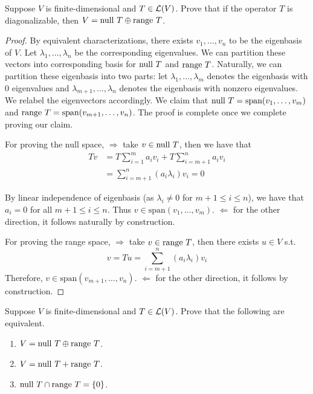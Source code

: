 \documentclass{extarticle}
\begin{document}
\begin{problem}{3}
    Suppose \(V\) is finite-dimensional and \(T \in \mathcal{L}(V)\). Prove that if the operator \(T\) is 
    diagonalizable, then \(V = \text{null } T \oplus \text{range } T\).
\end{problem}

\begin{proof}
By equivalent characterizations, there exists \(v_1, \ldots, v_n\) to be the eigenbasis of \(V\). Let 
\(\lambda_1, \ldots, \lambda_n\) be the corresponding eigenvalues. We can partition these vectors into corresponding 
basis for \(\text{null } T\) and \(\text{range } T\). Naturally, we can partition these eigenbasis into two parts: let 
\(\lambda_1, \ldots, \lambda_m\) denotes the eigenbasis with 0 eigenvalues and \(\lambda_{m+1}, \ldots, 
\lambda_n\) denotes the eigenbasis with nonzero eigenvalues. We relabel the eigenvectors accordingly. 
We claim that \(\text{null } T = \text{span}(v_1, 
\ldots, v_m)\) and \(\text{range } T = \text{span}(v_{m+1}, \ldots, v_n)\). The proof is complete once 
we complete proving our claim. 

For proving the null space, \(\Rightarrow\) take \(v \in \text{null } T\), then we have that 
\begin{align*}
    Tv 
    &= T \sum_{i=1}^{m}a_i v_i + T \sum_{i=m+1}^{n} a_i v_i \\ 
    &= \sum_{i=m+1}^{n} (a_i \lambda_i) v_i = 0 
\end{align*}

By linear independence of eigenbasis (as \(\lambda_i \neq 0 \) for \(m+1 \leq i \leq n\)), we have that 
\(a_i = 0\) for all \(m+1 \leq i \leq n\). Thus \(v \in \text{span}(v_1, \ldots, v_m)\). \(\Leftarrow\) 
for the other direction, it follows naturally by construction. 

For proving the range space, \(\Rightarrow\) take \(v \in \text{range } T\), then there exists \(u \in V\) 
s.t. 
\[v = Tu  = \sum_{i=m+1}^{n} (a_i \lambda_i)v_i\]
Therefore, \(v \in \text{span}(v_{m+1}, \ldots, v_n)\). \(\Leftarrow\) for the other direction, it follows 
by construction. 
\end{proof}

\begin{problem}{4}
    Suppose \(V\) is finite-dimensional and \(T \in \mathcal{L}(V)\). Prove that the following are equivalent.
    \begin{enumerate}[label=(\alph*)]
        \item \(V = \text{null } T \oplus \text{range } T\). 
        \item \(V = \text{null } T + \text{range } T\). 
        \item \(\text{null } T \cap \text{range } T = \{0\}\).
    \end{enumerate}
\end{problem}
\end{document}
